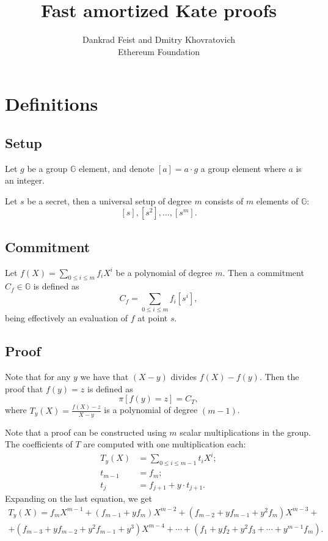 \documentclass[a4paper]{article}
\title{Fast amortized Kate proofs}
\author{Dankrad Feist and Dmitry Khovratovich \\Ethereum Foundation}
\begin{document}
\maketitle

\section{Definitions}

\subsection{Setup}

Let $g$ be a group $\mathbb{G}$ element, and denote $[a] = a\cdot g$ a group element where $a$ is an integer. 

Let $s$ be a secret, then a universal setup of degree $m$ consists of  $m$ elements of $\mathbb{G}$:
$$
[s], [s^2], \ldots, [s^m].
$$


\subsection{Commitment}
Let $f(X) = \sum_{0\leq i \leq m}f_i X^i$ be a polynomial of degree $m$. Then a commitment $C_f\in \mathbb{G}$ is defined as
$$
C_f = \sum_{0\leq i \leq m} f_i[s^i],
$$
being effectively an evaluation of $f$ at point $s$.

\subsection{Proof}
Note that for any $y$ we have that $(X-y)$ divides $f(X) - f(y)$. Then the proof that $f(y) = z$ is defined as
$$
\pi[f(y)=z] = C_T,
$$
where $T_y(X) = \frac{f(X)-z}{X-y}$ is a polynomial of degree $(m-1)$.

Note that a proof can be constructed using $m$ scalar multiplications in the group. The coefficients of $T$ are computed with one multiplication each:
\begin{align}
    T_y(X) &= \sum_{0\leq i \leq m-1}t_i X^i;\\
    t_{m-1} &= f_m;\\
    t_j &= f_{j+1}+y\cdot t_{j+1} .
\end{align}
Expanding on the last equation, we get
\begin{multline}
T_y(X) =f_mX^{m-1} + (f_{m-1}+yf_{m})X^{m-2} + (f_{m-2}+yf_{m-1}+y^2f_m)X^{m-3} +\\+
(f_{m-3}+yf_{m-2}+y^2f_{m-1}+y^3)X^{m-4}+\cdots +  (f_{1}+yf_{2}+y^2f_3+\cdots+y^{m-1}f_m).
\end{multline}
\end{document}
